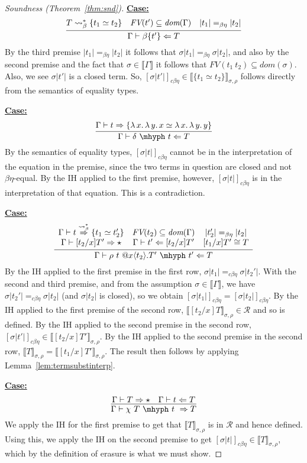 \documentclass{article}
\newcommand{\absu}[3]{{#1}\, #2.\, #3}
\newcommand{\interp}[1]{\llbracket #1 \rrbracket}
\newcommand{\tpcheck}[0]{\Leftarrow}
\newcommand{\tpsynth}[0]{\Rightarrow}
\newcommand{\tpsynthleads}[0]{\ensuremath{\overset{\leadsto_\beta^*}{\Rightarrow}}}
\newcommand{\cbe}[0]{c\beta\eta}
\newcommand{\startcase}[1]{\vspace{#1} \noindent\textbf{\underline{Case:}}}
\begin{document}
\begin{proof}[Soundness (Theorem~\ref{thm:snd})]
\startcase{.2cm}
\[
  \infer{\Gamma\vdash \beta\{t'\} \tpcheck T}
  {T \leadsto_\beta^* \{t_1 \simeq t_2\} \quad \textit{FV}(t')\subseteq \textit{dom}(\Gamma) \quad |t_1| =_{\beta\eta} |t_2|}
\]
By the third premise \(|t_1| =_{\beta\eta} |t_2|\) it follows that \(\sigma|t_1|
=_{\beta\eta} \sigma|t_2|\), and also by the second premise and the fact that
\(\sigma \in \interp{\Gamma}\) it follows that
\(\textit{FV}(t_1\ t_2) \subseteq \textit{dom}(\sigma)\).
Also, we see \(\sigma|t'|\) is a closed term.
So, $[\sigma|t'|]_{\cbe}\in\interp{\{ t_1 \simeq t_2 \}}_{\sigma,\rho}$ follows
directly from the semantics of equality types.

\startcase{.2cm}
\[
    \infer{\Gamma\vdash \delta\ \mhyph\ t \tpcheck T}{\Gamma\vdash t\tpsynth \{ \absu{\lambda}{x}{\absu{\lambda}{y}{x}} \simeq \absu{\lambda}{x}{\absu{\lambda}{y}{y}}\}}  
\]
By the semantics of equality types, $[\sigma|t|]_{\cbe}$ cannot be in the interpretation of the equation in the premise,
since the two terms in question are closed and not $\beta\eta$-equal.  By the IH applied to the first premise, however,
$[\sigma|t|]_{\cbe}$ is in the interpretation of that equation.  This is a contradiction.

\startcase{.2cm}
\[
  \infer{\Gamma \vdash \rho\ t\ @x\langle t_2 \rangle.T'\ \mhyph\ t' \tpcheck T}
  {
    \begin{array}{ccc}
      \Gamma \vdash t \tpsynthleads \{t_1 \simeq t_2'\}
      & \textit{FV}(t_2) \subseteq \textit{dom}(\Gamma)
      & |t_2'| =_{\beta\eta} |t_2|
      \\ \Gamma \vdash [t_2/x] T' \tpsynth \star
      & \Gamma \vdash t' \tpcheck [t_2/x]T'
      & [t_1/x]T' \cong T
    \end{array}
  }
\]
By the IH applied to the first premise in the first row, $\sigma|t_1| =_{\cbe}
\sigma|t_2'|$.
With the second and third premise, and from the assumption \(\sigma \in
\interp{\Gamma}\), we have \(\sigma|t_2'| =_{\cbe} \sigma|t_2|\) (and
\(\sigma|t_2|\) is closed), so we obtain
\([\sigma|t_1|]_{\cbe} = [\sigma|t_2|]_{\cbe}\).
By the IH applied to the first premise of the second row,
\(\interp{[t_2/x]T}_{\sigma,\rho} \in \mathcal{R}\) and so is defined.
By the IH applied to the second premise in the second row,
\([\sigma|t'|]_{c\beta\eta} \in \interp{[t_2/x]T'}_{\sigma,\rho}\).
By the IH applied to the second premise in the second row,
\(\interp{T}_{\sigma,\rho} = \interp{[t_1/x]T'}_{\sigma,\rho}\).
The result then follows by applying Lemma~\ref{lem:termsubstinterp}.

\startcase{.2cm}
\[
  \infer{\Gamma \vdash \chi\ T\ \mhyph\ t\ \tpsynth T}
  {\Gamma \vdash T \tpsynth \star & \Gamma \vdash t \tpcheck T}
\]
We apply the IH for the first premise to get that
$\interp{T}_{\sigma,\rho}$ is in $\mathcal{R}$ and hence defined.
Using this, we apply the IH on the second premise to get \([\sigma|t|]_{\cbe}
\in \interp{T}_{\sigma,\rho}\), which by the definition of erasure is what we
must show.


\end{proof}
\end{document}
